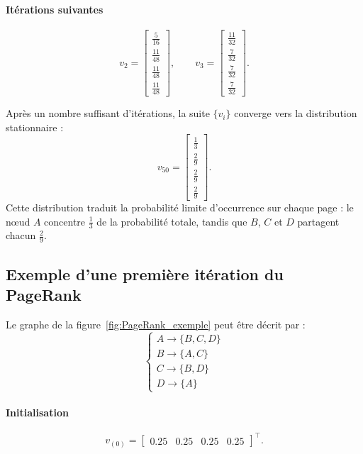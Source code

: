 \documentclass[conference]{IEEEtran}
\begin{document}
\paragraph{Itérations suivantes}
\[
v_{2} =
\begin{bmatrix}
\frac{5}{16}\\[2pt]
\frac{11}{48}\\[2pt]
\frac{11}{48}\\[2pt]
\frac{11}{48}
\end{bmatrix},
\qquad
v_{3} =
\begin{bmatrix}
\frac{11}{32}\\[2pt]
\frac{7}{32}\\[2pt]
\frac{7}{32}\\[2pt]
\frac{7}{32}
\end{bmatrix}.
\]

Après un nombre suffisant d'itérations, la suite $\{v_i\}$ converge vers la distribution stationnaire :
\[
v_{50} =
\begin{bmatrix}
\frac{1}{3}\\[2pt]
\frac{2}{9}\\[2pt]
\frac{2}{9}\\[2pt]
\frac{2}{9}
\end{bmatrix}.
\]
Cette distribution traduit la probabilité limite d'occurrence sur chaque page : le nœud $A$ concentre $\tfrac{1}{3}$ de la probabilité totale, tandis que $B$, $C$ et $D$ partagent chacun $\tfrac{2}{9}$.

\subsection{Exemple d'une première itération du PageRank}

Le graphe de la figure~\ref{fig:PageRank_exemple} peut être décrit par :
\[
\begin{cases}
A \to \{B, C, D\} \\[3pt]
B \to \{A, C\} \\[3pt]
C \to \{B, D\} \\[3pt]
D \to \{A\}
\end{cases}
\]

\paragraph{Initialisation}
\[
v_{(0)} = 
\begin{bmatrix}
0.25 & 0.25 & 0.25 & 0.25
\end{bmatrix}^{\top}.
\]
\end{document}
